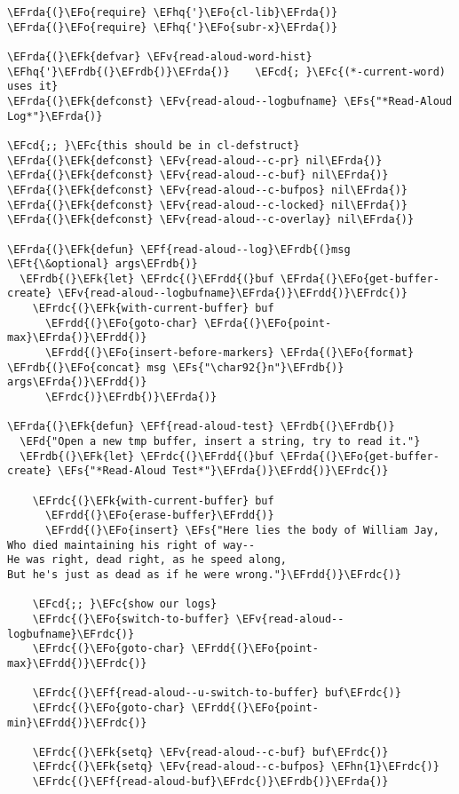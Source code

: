 \documentclass[a4wide,10pt]{article}
\newcommand{\EFc}[1]{\textcolor{EFc}{#1}} %
\newcommand{\EFcd}[1]{\textcolor{EFcd}{#1}} %
\newcommand{\EFs}[1]{\textcolor{EFs}{#1}} %
\newcommand{\EFd}[1]{\textcolor{EFd}{#1}} %
\newcommand{\EFk}[1]{\textcolor{EFk}{#1}} %
\newcommand{\EFf}[1]{\textcolor{EFf}{#1}} %
\newcommand{\EFv}[1]{\textcolor{EFv}{#1}} %
\newcommand{\EFt}[1]{\textcolor{EFt}{#1}} %
\newcommand{\EFo}[1]{\textcolor{EFo}{#1}} %
\newcommand{\EFhn}[1]{\textcolor{EFhn}{\textbf{#1}}} %
\newcommand{\EFhq}[1]{\textcolor{EFhq}{#1}} %
\newcommand{\EFrda}[1]{\textcolor{EFrda}{#1}} %
\newcommand{\EFrdb}[1]{\textcolor{EFrdb}{#1}} %
\newcommand{\EFrdc}[1]{\textcolor{EFrdc}{#1}} %
\newcommand{\EFrdd}[1]{\textcolor{EFrdd}{#1}} %
\begin{document}
\begin{Code}
\begin{Verbatim}
\EFrda{(}\EFo{require} \EFhq{'}\EFo{cl-lib}\EFrda{)}
\EFrda{(}\EFo{require} \EFhq{'}\EFo{subr-x}\EFrda{)}

\EFrda{(}\EFk{defvar} \EFv{read-aloud-word-hist} \EFhq{'}\EFrdb{(}\EFrdb{)}\EFrda{)}	\EFcd{; }\EFc{(*-current-word) uses it}
\EFrda{(}\EFk{defconst} \EFv{read-aloud--logbufname} \EFs{"*Read-Aloud Log*"}\EFrda{)}

\EFcd{;; }\EFc{this should be in cl-defstruct}
\EFrda{(}\EFk{defconst} \EFv{read-aloud--c-pr} nil\EFrda{)}
\EFrda{(}\EFk{defconst} \EFv{read-aloud--c-buf} nil\EFrda{)}
\EFrda{(}\EFk{defconst} \EFv{read-aloud--c-bufpos} nil\EFrda{)}
\EFrda{(}\EFk{defconst} \EFv{read-aloud--c-locked} nil\EFrda{)}
\EFrda{(}\EFk{defconst} \EFv{read-aloud--c-overlay} nil\EFrda{)}

\EFrda{(}\EFk{defun} \EFf{read-aloud--log}\EFrdb{(}msg \EFt{\&optional} args\EFrdb{)}
  \EFrdb{(}\EFk{let} \EFrdc{(}\EFrdd{(}buf \EFrda{(}\EFo{get-buffer-create} \EFv{read-aloud--logbufname}\EFrda{)}\EFrdd{)}\EFrdc{)}
    \EFrdc{(}\EFk{with-current-buffer} buf
      \EFrdd{(}\EFo{goto-char} \EFrda{(}\EFo{point-max}\EFrda{)}\EFrdd{)}
      \EFrdd{(}\EFo{insert-before-markers} \EFrda{(}\EFo{format} \EFrdb{(}\EFo{concat} msg \EFs{"\char92{}n"}\EFrdb{)} args\EFrda{)}\EFrdd{)}
      \EFrdc{)}\EFrdb{)}\EFrda{)}

\EFrda{(}\EFk{defun} \EFf{read-aloud-test} \EFrdb{(}\EFrdb{)}
  \EFd{"Open a new tmp buffer, insert a string, try to read it."}
  \EFrdb{(}\EFk{let} \EFrdc{(}\EFrdd{(}buf \EFrda{(}\EFo{get-buffer-create} \EFs{"*Read-Aloud Test*"}\EFrda{)}\EFrdd{)}\EFrdc{)}

    \EFrdc{(}\EFk{with-current-buffer} buf
      \EFrdd{(}\EFo{erase-buffer}\EFrdd{)}
      \EFrdd{(}\EFo{insert} \EFs{"Here lies the body of William Jay,
Who died maintaining his right of way--
He was right, dead right, as he speed along,
But he's just as dead as if he were wrong."}\EFrdd{)}\EFrdc{)}

    \EFcd{;; }\EFc{show our logs}
    \EFrdc{(}\EFo{switch-to-buffer} \EFv{read-aloud--logbufname}\EFrdc{)}
    \EFrdc{(}\EFo{goto-char} \EFrdd{(}\EFo{point-max}\EFrdd{)}\EFrdc{)}

    \EFrdc{(}\EFf{read-aloud--u-switch-to-buffer} buf\EFrdc{)}
    \EFrdc{(}\EFo{goto-char} \EFrdd{(}\EFo{point-min}\EFrdd{)}\EFrdc{)}

    \EFrdc{(}\EFk{setq} \EFv{read-aloud--c-buf} buf\EFrdc{)}
    \EFrdc{(}\EFk{setq} \EFv{read-aloud--c-bufpos} \EFhn{1}\EFrdc{)}
    \EFrdc{(}\EFf{read-aloud-buf}\EFrdc{)}\EFrdb{)}\EFrda{)}


\end{Verbatim}
\end{Code}
\end{document}
